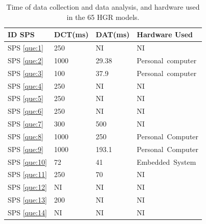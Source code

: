 \documentclass[sensors,review,accept,moreauthors,pdftex]{Definitions/mdpi}
\begin{document}
		
\begin{table}[H]
\centering
\caption{Time of data collection and data analysis, and hardware used in the 65 HGR models.} \label{tab:11}
	\begin{tabular}{p{33pt}p{40pt}p{40pt}p{100pt}}
	\toprule
		\textbf{ID SPS}&\textbf{DCT(ms)}&\textbf{DAT(ms)}&\textbf{Hardware Used}\\
	\midrule
%	
%	
%	
%			
		
		SPS \ref{que:1} 	&	250	&	NI	&	NI	\\
		
		SPS \ref{que:2}	&	1000	&	29.38	&	Personal~computer	\\
		
		SPS \ref{que:3}	&	100	&	37.9	&	Personal~computer	\\
		
		SPS \ref{que:4}	&	250	&	NI	&	NI	\\
		
		SPS \ref{que:5}	&	250	&	NI	&	NI	\\
		
		SPS \ref{que:6}	&	250	&	NI	&	NI	\\
		
		SPS \ref{que:7}	&	300	&	500	&	NI	\\
		
		SPS \ref{que:8}	&	1000	&	250	&	Personal~Computer	\\
		
		SPS \ref{que:9}	&	1000	&	193.1	&	Personal~Computer	\\
		
		SPS \ref{que:10}	&	72	&	41	&	Embedded~System	\\
		
		SPS \ref{que:11}	&	250	&	70	&	NI	\\
		
		SPS \ref{que:12}	&	NI	&	NI	&	NI	\\
		
		SPS \ref{que:13}	&	200	&	NI	&	NI	\\
		
		SPS \ref{que:14}	&	NI	&	NI	&	NI	\\
		

\end{tabular}
\end{table}
\end{document}
